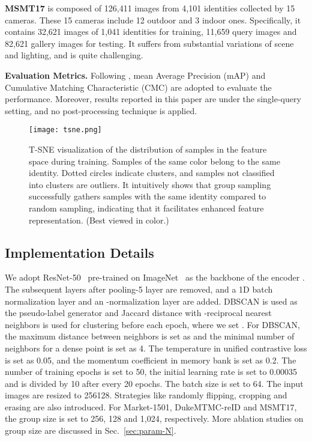 \documentclass[lettersize,journal]{IEEEtran}
\begin{document}
\textbf{MSMT17} \cite{MSMT} is composed of 126,411 images from 4,101 identities collected by 15 cameras. 
These 15 cameras include 12 outdoor and 3 indoor ones.
Specifically, it contains 32,621 images of 1,041 identities for training, 11,659 query images and 82,621 gallery images for testing.
It suffers from substantial variations of scene and lighting, and is quite challenging. 

\textbf{Evaluation Metrics.} Following \cite{Market}, mean Average Precision (mAP) and Cumulative Matching Characteristic (CMC) are adopted to evaluate the performance. Moreover, results reported in this paper are under the single-query setting, and no post-processing technique is applied.


\begin{figure*}[h]
\begin{center}
\texttt{[image: tsne.png]}
\vspace{-2pt}
\caption{T-SNE visualization of the distribution of samples in the feature space during training. Samples of the same color belong to the same identity. Dotted circles indicate clusters, and samples not classified into clusters are outliers. It intuitively shows that group sampling successfully gathers samples with the same identity compared to random sampling, indicating that it facilitates enhanced feature representation. (Best viewed in color.)}
\label{fig:tsne}
\end{center}
\end{figure*}

\subsection{Implementation Details} \label{sec:details}

We adopt ResNet-50~\cite{ResNet} pre-trained on ImageNet~\cite{ImageNet} as the backbone of the encoder . The subsequent layers after pooling-5 layer are removed, and a 1D batch normalization layer and an -normalization layer are added. 
DBSCAN \cite{DBSCAN} is used as the pseudo-label generator  and Jaccard distance with -reciprocal nearest neighbors \cite{rerank} is used for clustering before each epoch, where we set . For DBSCAN, the maximum distance between neighbors is set as  and the minimal number of neighbors for a dense point is set as 4. The temperature  in unified contrastive loss is set as 0.05, and the momentum coefficient in memory bank is set as 0.2. The number of training epochs is set to 50, the initial learning rate is set to 0.00035 and is divided by 10 after every 20 epochs. The batch size is set to 64. The input images are resized to 256128. Strategies like randomly flipping, cropping and erasing \cite{erasing} are also introduced.
For Market-1501, DukeMTMC-reID and MSMT17, the group size  is set to 256, 128 and 1,024, respectively. More ablation studies on group size  are discussed in Sec.~\ref{sec:param-N}.
\end{document}
